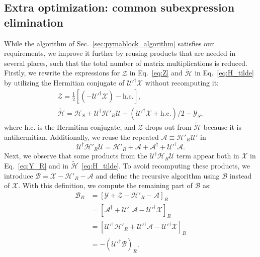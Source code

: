 \subsection{Extra optimization: common subexpression elimination}
While the algorithm of Sec.~\ref{sec:pymablock_algorithm} satisfies our requirements, we improve it further by reusing products that are needed in several places, such that the total number of matrix multiplications is reduced.
Firstly, we rewrite the expressions for $\mathcal{Z}$ in Eq.~\eqref{eq:Z} and $\tilde{\mathcal{H}}$ in Eq.~\eqref{eq:H_tilde} by utilizing the Hermitian conjugate of $\mathcal{U}'^\dagger \mathcal{X}$ without recomputing it:
%
\begin{gather*}
\mathcal{Z} = \frac{1}{2}\left[(-\mathcal{U}'^\dagger \mathcal{X})- \textrm{h.c.}\right],\\
\tilde{\mathcal{H}} = \mathcal{H}_{S} + \mathcal{U}^\dagger \mathcal{H}'_{R} \mathcal{U} - (\mathcal{U}'^\dagger \mathcal{X} + \textrm{h.c.})/2 - \mathcal{Y}_{S},
\end{gather*}
%
where $\textrm{h.c.}$ is the Hermitian conjugate, and $\mathcal{Z}$ drops out from $\tilde{\mathcal{H}}$ because it is antihermitian.
%
Additionally, we reuse the repeated $\mathcal{A} \equiv \mathcal{H}'_{R}\mathcal{U}'$ in
%
\begin{equation}
\label{eq:UHU}
\mathcal{U}^\dagger \mathcal{H}'_{R} \mathcal{U} = \mathcal{H}'_{R} + \mathcal{A} + \mathcal{A}^\dagger + \mathcal{U}'^\dagger \mathcal{A}.
\end{equation}
%
Next, we observe that some products from the $\mathcal{U}^{\dagger} \mathcal{H}_{R}\mathcal{U}$ term appear both in $\mathcal{X}$ in Eq.~\eqref{eq:Y_R} and in $\tilde{\mathcal{H}}$~\eqref{eq:H_tilde}.
%
To avoid recomputing these products, we introduce $\mathcal{B} = \mathcal{X} - \mathcal{H}'_{R} - \mathcal{A}$ and define the recursive algorithm using $\mathcal{B}$ instead of $\mathcal{X}$.
%
With this definition, we compute the remaining part of $\mathcal{B}$ as:
%
\begin{equation}
\label{eq:B_offdiag}
\begin{aligned}
  \mathcal{B}_{R} &= \left[\mathcal{Y} + \mathcal{Z} - \mathcal{H}'_{R} - \mathcal{A} \right]_{R}\\
  &= \left[\mathcal{A}^\dagger + \mathcal{U}'^\dagger\mathcal{A} - \mathcal{U}'^\dagger \mathcal{X} \right]_{R}\\
  &= \left[\mathcal{U}'^\dagger\mathcal{H}'_{R} + \mathcal{U}'^\dagger\mathcal{A} - \mathcal{U}'^\dagger \mathcal{X} \right]_{R}\\
  &= -(\mathcal{U'}^\dagger \mathcal{B})_{R},
\end{aligned}
\end{equation}
